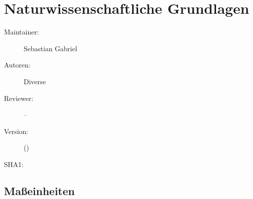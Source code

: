 \def\ChapterCode{NWG}
\chapter
[\CO{[NWG]} Naturwissenschaftliche Grundlagen]
{Naturwissenschaftliche Grundlagen}
\ChapterIntro
{%
\noindent\SectionUnderConstruction{}
}
{%
\begin{description}
  \item[Maintainer:] Sebastian Gabriel
  \item[Autoren:] Diverse
  \item[Reviewer:] --
  \item[Version:] {\DocVersion} ({\DocVersionInfo})
  \item[SHA1:] {\DocGitCommit}
\end{description}

{\TxTeilkapitelAASS}
}




\section{Maßeinheiten}





\ChapterEnd